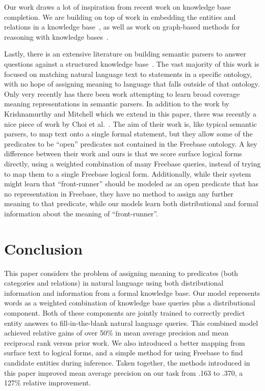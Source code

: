 \documentclass[11pt]{article}
\begin{document}
Our work draws a lot of inspiration from recent work on knowledge base
completion.  We are building on top of work in embedding the entities
and relations in a knowledge
base~\cite{riedel-2013-mf-universal-schema,nickel-2011-rescal,bordes-2013-transe},
as well as work on graph-based methods for reasoning with knowledge
bases~\cite{lao-2010-original-pra,gardner-2014-vector-space-pra,neelakantan-2015-rnn-kbc}.

Lastly, there is an extensive literature on building semantic parsers
to answer questions against a structured knowledge
base~\cite{zettlemoyer-2005-ccg,berant-2013-semantic-parsing-qa,%
kwiatkowski-2013-ontology-matching,krishnamurthy-2012-semantic-parsing}.
The vast majority of this work is focused on matching natural language
text to statements in a specific ontology, with no hope of assigning
meaning to language that falls outside of that ontology.  Only very
recently has there been work attempting to learn broad coverage
meaning representations in semantic parsers.  In addition to the work
by Krishnamurthy and Mitchell which we extend in this paper, there was
recently a nice piece of work by Choi et
al.~.  The
aim of their work is, like typical semantic parsers, to map text onto
a single formal statement, but they allow some of the predicates to be
``open'' predicates not contained in the Freebase ontology.  A key
difference between their work and ours is that we score surface
logical forms directly, using a weighted combination of many Freebase
queries, instead of trying to map them to a single Freebase logical
form.  Additionally, while their system might learn that
``front-runner'' should be modeled as an open predicate that has no
representation in Freebase, they have no method to assign any further
meaning to that predicate, while our models learn both distributional
and formal information about the meaning of ``front-runner''.

\section{Conclusion}
\label{sec:conclusion}

This paper considers the problem of assigning meaning to predicates
(both categories and relations) in natural language using both
distributional information and information from a formal knowledge
base. Our model represents words as a weighted combination of
knowledge base queries plus a distributional component. Both of these
components are jointly trained to correctly predict entity answers to
fill-in-the-blank natural language queries. This combined model
achieved relative gains of over 50\% in mean average precision and
mean reciprocal rank versus prior work.  We also introduced a better
mapping from surface text to logical forms, and a simple method for
using Freebase to find candidate entities during inference.  Taken
together, the methods introduced in this paper improved mean average
precision on our task from .163 to .370, a 127\% relative improvement.
\end{document}
